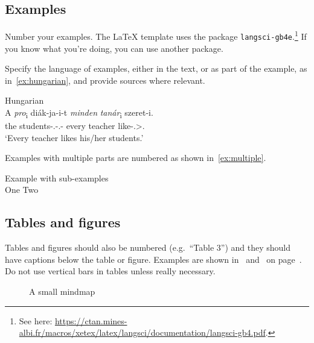 \subsection{Examples}

Number your examples. The \LaTeX{} template uses the package
\texttt{langsci-gb4e}.\footnote{See here: \url{https://ctan.mines-albi.fr/macros/xetex/latex/langsci/documentation/langsci-gb4.pdf}.} If you know what you're doing, you can use
another package.

Specify the language of examples, either in the text, or as part of the example,
as in~\eqref{ex:hungarian}, and provide sources where relevant.

\ea\label{ex:hungarian}Hungarian \parencite[adapted from][469]{EKiss2008}\\
    \gll    A \emph{pro}\textsubscript{i} diák-ja-i-t \emph{minden} \emph{tanár}\textsubscript{i} szeret-i.\\
            the {} students-\Poss.\Tsg-\Poss.\Pl-\Acc{} every teacher like-\Tsg.\Sbj>\Third.\Obj{}\\
    \glt    `Every teacher likes his/her students.'\\
\z

Examples with multiple parts are numbered as shown in~\eqref{ex:multiple}.

\ea\label{ex:multiple}Example with sub-examples\\
    \ea One
    \ex Two
    \z
\z

\subsection{Tables and figures}

Tables and figures should also be numbered (e.g.\ \enquote{Table 3}) and they
should have captions below the table or figure. Examples are shown
in~ and~ on page~\pageref{fig:figure}. Do not
use vertical bars in tables unless really necessary.

\begin{figure}
\caption{A small mindmap}\label{fig:figure}
\end{figure}

